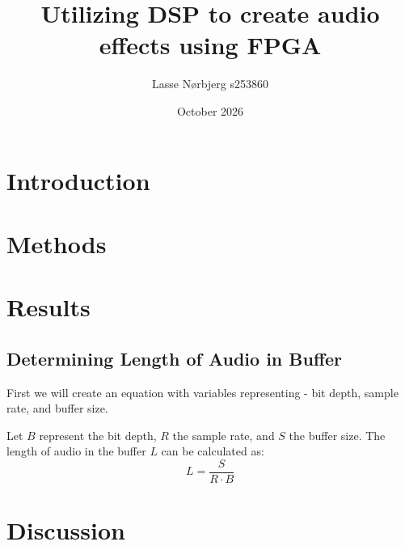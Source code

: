 \documentclass{article}
\title{Utilizing DSP to create audio effects using FPGA}
\author{Lasse Nørbjerg s253860}
\date{October 2026}
\begin{document}
\maketitle

\section{Introduction}

\section{Methods}
\section{Results}

\subsection{Determining Length of Audio in Buffer}

First we will create an equation with variables representing - bit depth, sample rate, and buffer size.

Let $B$ represent the bit depth, $R$ the sample rate, and $S$ the buffer size. The length of audio in the buffer $L$ can be calculated as:
\[
L = \frac{S}{R \cdot B}
\]

\section{Discussion}
\end{document}
